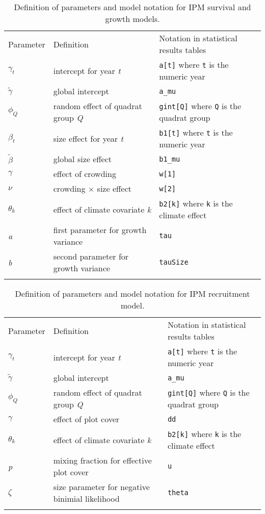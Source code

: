 \documentclass[12pt,]{article}
\begin{document}
\begin{longtable}[c]{@{}lll@{}}
\toprule\addlinespace
Parameter & Definition & Notation in statistical results tables
\\\addlinespace
\midrule\endhead
$\gamma_{t}$ & intercept for year \emph{t} & \texttt{a{[}t{]}} where
\texttt{t} is the numeric year
\\\addlinespace
$\tilde{\gamma}$ & global intercept & \texttt{a\_mu}
\\\addlinespace
$\phi_{Q}$ & random effect of quadrat group \emph{Q} &
\texttt{gint{[}Q{]}} where \texttt{Q} is the quadrat group
\\\addlinespace
$\beta_{t}$ & size effect for year \emph{t} & \texttt{b1{[}t{]}} where
\texttt{t} is the numeric year
\\\addlinespace
$\tilde{\beta}$ & global size effect & \texttt{b1\_mu}
\\\addlinespace
$\gamma$ & effect of crowding & \texttt{w{[}1{]}}
\\\addlinespace
$\nu$ & crowding $\times$ size effect & \texttt{w{[}2{]}}
\\\addlinespace
$\theta_{k}$ & effect of climate covariate \emph{k} & \texttt{b2{[}k{]}}
where \texttt{k} is the climate effect
\\\addlinespace
\emph{a} & first parameter for growth variance & \texttt{tau}
\\\addlinespace
\emph{b} & second parameter for growth variance & \texttt{tauSize}
\\\addlinespace
\bottomrule
\addlinespace
\caption{Definition of parameters and model notation for IPM survival
and growth models.}
\end{longtable}

\begin{longtable}[c]{@{}lll@{}}
\toprule\addlinespace
Parameter & Definition & Notation in statistical results tables
\\\addlinespace
\midrule\endhead
$\gamma_{t}$ & intercept for year \emph{t} & \texttt{a{[}t{]}} where
\texttt{t} is the numeric year
\\\addlinespace
$\tilde{\gamma}$ & global intercept & \texttt{a\_mu}
\\\addlinespace
$\phi_{Q}$ & random effect of quadrat group \emph{Q} &
\texttt{gint{[}Q{]}} where \texttt{Q} is the quadrat group
\\\addlinespace
$\gamma$ & effect of plot cover & \texttt{dd}
\\\addlinespace
$\theta_{k}$ & effect of climate covariate \emph{k} & \texttt{b2{[}k{]}}
where \texttt{k} is the climate effect
\\\addlinespace
\emph{p} & mixing fraction for effective plot cover & \texttt{u}
\\\addlinespace
$\zeta$ & size parameter for negative binimial likelihood &
\texttt{theta}
\\\addlinespace
\bottomrule
\addlinespace
\caption{Definition of parameters and model notation for IPM recruitment
model.}
\end{longtable}
\end{document}
